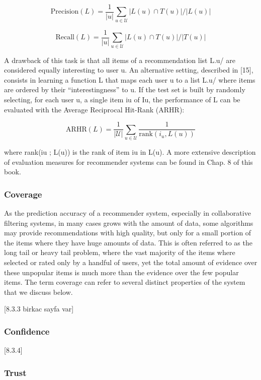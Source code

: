 $$
\mathrm { Precision } ( L ) = \frac { 1 } { | u | } \sum _ { u \in \mathcal { U } } | L ( u ) \cap T ( u ) | / | L ( u ) |
$$


$$
\mathrm { Recall } ( L ) = \frac { 1 } { | u | } \sum _ { u \in \mathcal { U } } | L ( u ) \cap T ( u ) | / | T ( u ) |
$$

A drawback of this task is that all items of a recommendation list L.u/ are considered equally interesting to user u. An alternative setting, described in [15], consists in learning a function L that maps each user u to a list L.u/ where items are ordered by their “interestingness” to u. If the test set is built by randomly selecting, for each user u, a single item iu of Iu, the performance of L can be evaluated with the Average Reciprocal Hit-Rank (ARHR):

$$
\mathrm { ARHR } ( L ) = \frac { 1 } { | \mathcal { U } | } \sum _ { u \in \mathcal { U } } \frac { 1 } { \mathrm { rank } \left( i _ { u } , L ( u ) \right) }
$$

where rank(iu ; L(u)) is the rank of item iu in L(u). A more extensive description of evaluation measures for recommender systems can be found in Chap. 8 of this book.


\subsubsection{Coverage}

As the prediction accuracy of a recommender system, especially in collaborative filtering systems, in many cases grows with the amount of data, some algorithms may provide recommendations with high quality, but only for a small portion of the items where they have huge amounts of data. This is often referred to as the long tail or heavy tail problem, where the vast majority of the items where selected or rated only by a handful of users, yet the total amount of evidence over these unpopular items is much more than the evidence over the few popular items.
The term coverage can refer to several distinct properties of the system that we discuss below.

[8.3.3 birkac sayfa var]

\subsubsection{Confidence}
[8.3.4]

\subsubsection{Trust}

